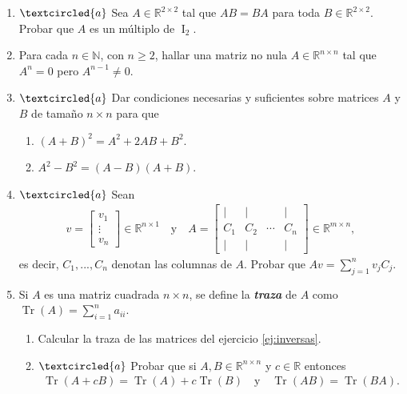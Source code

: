\documentclass[12pt]{amsart}
\begin{document}
\begin{enumerate}[topsep=6pt,itemsep=6pt]
\item\label{2x2 central} $\textcircled{a}$ Sea $A \in\mathbb{R}^{2\times 2}$ tal que $AB=BA$ para toda $B\in\mathbb{R}^{2\times 2}$. Probar que $A$ es un m\'ultiplo de $\operatorname{I}_2$.


\item  Para cada $n\in\mathbb{N}$, con $n\geq 2$, hallar una matriz no nula $A\in\mathbb{R}^{n\times n}$ tal que $A^n=0$ pero $A^{n-1}\neq0$.


\item\label{eq:binomio} $\textcircled{a}$ Dar condiciones necesarias y suficientes sobre matrices $A$ y $B$ de tama\~{n}o $n\times n$ para que
\begin{multicols}{2}
	\begin{enumerate}
		\item $(A + B)^2 = A^2 + 2AB + B^2$.
		\item $A^2 - B^2 = (A - B)(A + B)$.
	\end{enumerate}
\end{multicols}


\item\label{ej:multiplicar por columna} $\textcircled{a}$ Sean
\begin{align*}
v=\begin{bmatrix} v_1 \\ \vdots \\ v_n
\end{bmatrix}\in\mathbb{R}^{n\times1}
\quad\mbox{y}\quad A=\begin{bmatrix} \mid& \mid& &\mid\\ C_1 & C_2 & \cdots &C_n\\ \mid& \mid& &\mid\end{bmatrix}
\in\mathbb{R}^{m\times n},
\end{align*}
es decir, $C_1, ..., C_n$ denotan las columnas de $A$. Probar que $Av=\sum_{j=1}^nv_jC_j$.


\item\label{traza} Si $A$ es una matriz cuadrada $n\times n$, se define la {\it \textbf{traza}} de $A$
como $\operatorname{Tr}(A)=\displaystyle{\sum_{i=1}^n} a_{ii}$.
\begin{enumerate}[topsep=5pt,itemsep=5pt]
 \item Calcular la traza de las matrices del ejercicio  \eqref{ej:inversas}.
 \item\label{ej:traza}$\textcircled{a}$ Probar que si $A,B\in\mathbb{R}^{n\times n}$ y $c\in\mathbb{R}$ entonces
 \begin{align*}
 \operatorname{Tr}(A+cB)=\operatorname{Tr}(A)+c\operatorname{Tr}(B)
 \quad\mbox{y}\quad
 \operatorname{Tr}(AB)=\operatorname{Tr}(BA).
 \end{align*}
\end{enumerate}


\end{enumerate}
\end{document}
